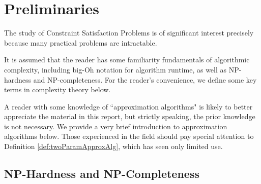 %
%
%
%

%
%
%
%
%
%
%
%
%

\section{Preliminaries}

The study of Constraint Satisfaction Problems is of significant interest precisely because many practical problems are intractable.  

It is assumed that the reader has some familiarity fundamentals of algorithmic complexity, including big-Oh notation for algorithm runtime, as well as NP-hardness and NP-completeness. 
For the reader's convenience, we define some key terms in complexity theory below.

A reader with some knowledge of ``approximation algorithms" is likely to better appreciate the material in this report, but strictly speaking, the prior knowledge is not necessary. 
We provide a very brief introduction to approximation algorithms below. 
Those experienced in the field should pay special attention to Definition \ref{def:twoParamApproxAlg}, which has seen only limited use.

\subsection{NP-Hardness and NP-Completeness}

